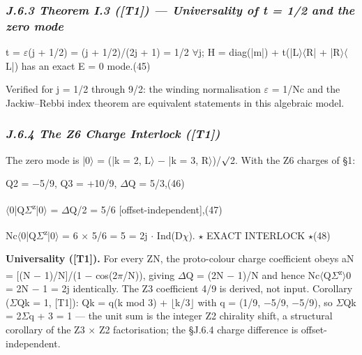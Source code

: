 \documentclass[11pt,letterpaper]{article}
\begin{document}
\subsubsection*{\itshape J.6.3  Theorem I.3 ([T1]) --- Universality of t = 1/2 and the zero mode}

\begingroup\centering t = $\varepsilon$(j + 1/2) = (j + 1/2)/(2j + 1) = 1/2  $\forall$j;   H = diag(|m|) + t(|L$\rangle$$\langle$R| + |R$\rangle$$\langle$L|) has an exact E = 0 mode.\hspace{2em}(45)\par\endgroup

\noindent Verified for j = 1/2 through 9/2: the winding normalisation $\varepsilon$ = 1/Nc and the Jackiw--Rebbi index theorem are equivalent statements in this algebraic model.

\subsubsection*{\itshape J.6.4  The Z6 Charge Interlock ([T1])}

\noindent The zero mode is |0$\rangle$ = (|k = 2, L$\rangle$ $-$ |k = 3, R$\rangle$)/$\surd$2. With the Z6 charges of §1:

\begingroup\centering Q2 = $-$5/9,  Q3 = +10/9,  $\Delta$Q = 5/3,\hspace{2em}(46)\par\endgroup

\begingroup\centering $\langle$0|Q$\Sigma$\textsuperscript{z}|0$\rangle$ = $\Delta$Q/2 = 5/6  [offset-independent],\hspace{2em}(47)\par\endgroup

\begingroup\centering Nc$\langle$0|Q$\Sigma$\textsuperscript{z}|0$\rangle$ = 6 $\times$ 5/6 = 5 = 2j $\cdot$ Ind(D$\chi$).   $\star$ EXACT INTERLOCK $\star$\hspace{2em}(48)\par\endgroup

\noindent \textbf{Universality ([T1]). }For every ZN, the proto-colour charge coefficient obeys aN = [(N $-$ 1)/N]/(1 $-$ cos(2$\pi$/N)), giving $\Delta$Q = (2N $-$ 1)/N and hence Nc$\langle$Q$\Sigma$\textsuperscript{z}$\rangle$0 = 2N $-$ 1 = 2j identically. The Z3 coefficient 4/9 is derived, not input. Corollary ($\Sigma$Qk = 1, [T1]): Qk = q(k mod 3) + $\lfloor$k/3$\rfloor$ with q = (1/9, $-$5/9, $-$5/9), so $\Sigma$Qk = 2$\Sigma$q + 3 = 1 --- the unit sum is the integer Z2 chirality shift, a structural corollary of the Z3 $\times$ Z2 factorisation; the §J.6.4 charge difference is offset-independent.
\end{document}
